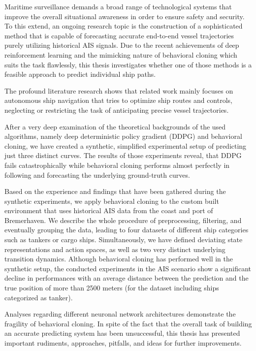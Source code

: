 Maritime surveillance demands a broad range of technological systems that improve the overall situational awareness in order to ensure safety and security. To this extend, an ongoing research topic is the construction of a sophisticated method that is capable of forecasting accurate end-to-end vessel trajectories purely utilizing historical AIS signals. Due to the recent achievements of deep reinforcement learning and the mimicking nature of behavioral cloning which suits the task flawlessly, this thesis investigates whether one of those methods is a feasible approach to predict individual ship paths.
\par
The profound literature research shows that related work mainly focuses on autonomous ship navigation that tries to optimize ship routes and controls, neglecting or restricting the task of anticipating precise vessel trajectories. 
\par
After a very deep examination of the theoretical backgrounds of the used algorithms, namely deep deterministic policy gradient (DDPG) and behavioral cloning, we have created a synthetic, simplified experimental setup of predicting just three distinct curves. The results of those experiments reveal, that DDPG fails catastrophically while behavioral cloning performs almost perfectly in following and forecasting the underlying ground-truth curves. \par
Based on the experience and findings that have been gathered during the synthetic experiments, we apply behavioral cloning to the custom built environment that uses historical AIS data from the coast and port of Bremerhaven. We describe the whole procedure of preprocessing, filtering, and eventually grouping the data, leading to four datasets of different ship categories such as tankers or cargo ships. Simultaneously, we have defined deviating state representations and action spaces, as well as two very distinct underlying transition dynamics. Although behavioral cloning has performed well in the synthetic setup, the conducted experiments in the AIS scenario show a significant decline in performances with an average distance between the prediction and the true position of more than 2500 meters (for the dataset including ships categorized as tanker).
\par
Analyses regarding different neuronal network architectures demonstrate the fragility of behavioral cloning. In spite of the fact that the overall task of building an accurate predicting system has been unsuccessful, this thesis has presented important rudiments, approaches, pitfalls, and ideas for further improvements.